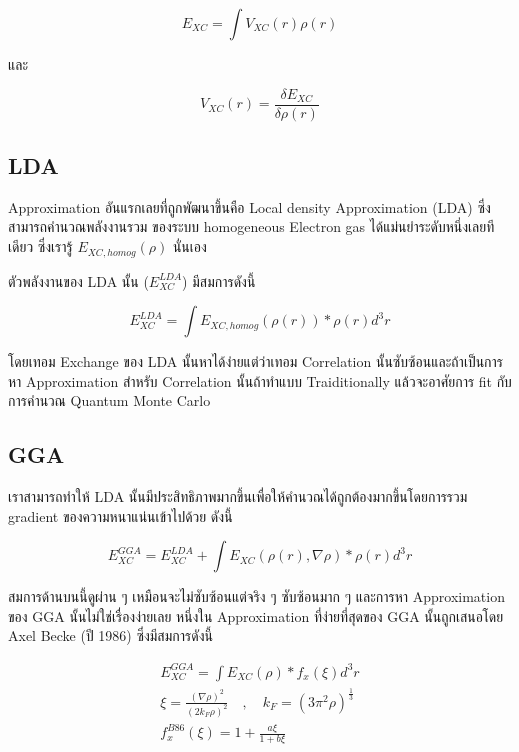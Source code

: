 \begin{equation}
    E_{XC} = \int V_{X C}(r) \rho(r)
\end{equation}

\noindent และ

\begin{equation}
    V_{X C}(r) = \frac{\delta E_{X C}}{\delta \rho(r)}
\end{equation}

\subsection{LDA}

Approximation อันแรกเลยที่ถูกพัฒนาขึ้นคือ Local density Approximation (LDA) ซึ่งสามารถคำนวณพลังงานรวม%
ของระบบ homogeneous Electron gas ได้แม่นยำระดับหนึ่งเลยทีเดียว ซึ่งเรารู้ $E_{XC, homog}(\rho)$
นั่นเอง

ตัวพลังงานของ LDA นั้น ($E^{LDA}_{XC}$) มีสมการดังนี้

\begin{equation}
    E^{LDA}_{XC} = \int E_{XC,homog} (\rho(r)) * \rho(r)d^{3}r
\end{equation}

โดยเทอม Exchange ของ LDA นั้นหาได้ง่ายแต่ว่าเทอม Correlation นั้นซับซ้อนและถ้าเป็นการหา Approximation
สำหรับ Correlation นั้นถ้าทำแบบ Traiditionally แล้วจะอาศัยการ fit กับการคำนวณ Quantum Monte Carlo

\subsection{GGA}

เราสามารถทำให้ LDA นั้นมีประสิทธิภาพมากขึ้นเพื่อให้คำนวณได้ถูกต้องมากขึ้นโดยการรวม gradient ของความหนาแน่นเข้าไปด้วย
ดังนี้

\begin{equation}
    E^{GGA}_{XC} = E^{LDA}_{XC} + \int E_{XC} (\rho(r), \nabla\rho) * \rho(r)d^{3}r
\end{equation}

สมการด้านบนนี้ดูผ่าน ๆ เหมือนจะไม่ซับซ้อนแต่จริง ๆ ซับซ้อนมาก ๆ และการหา Approximation ของ GGA
นั้นไม่ใช่เรื่องง่ายเลย หนึ่งใน Approximation ที่ง่ายที่สุดของ GGA นั้นถูกเสนอโดย Axel Becke (ปี 1986)
ซึ่งมีสมการดังนี้

\begin{gather}
    E^{GGA}_{XC} = \int E_{XC} (\rho) * f_{x}(\xi) d^{3}r \\
    \xi = \frac{(\nabla \rho)^{2}}{(2 k_{F} \rho)^{2}}
    \quad , \quad k_{F} = (3\pi^{2}\rho)^{\frac{1}{3}} \\
    f^{B86}_{x}(\xi) = 1 + \frac{a\xi}{1 + b\xi}
\end{gather}

